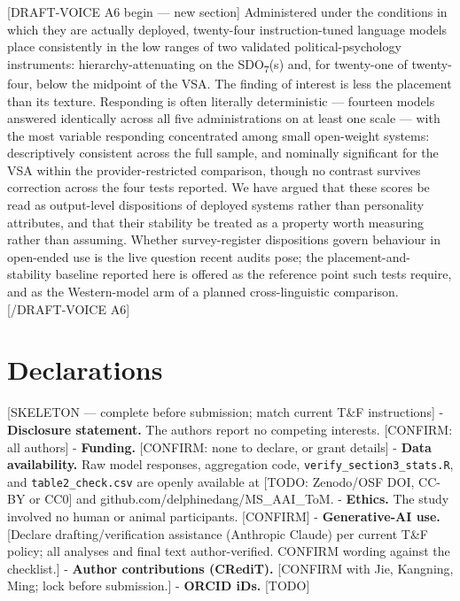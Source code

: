 \documentclass[
]{article}
\newcounter{none} %
\begin{document}
{[}DRAFT-VOICE A6 begin --- new section{]} Administered under the
conditions in which they are actually deployed, twenty-four
instruction-tuned language models place consistently in the low ranges
of two validated political-psychology instruments: hierarchy-attenuating
on the SDO\textsubscript{7}(s) and, for twenty-one of twenty-four, below
the midpoint of the VSA. The finding of interest is less the placement
than its texture. Responding is often literally deterministic ---
fourteen models answered identically across all five administrations on
at least one scale --- with the most variable responding concentrated
among small open-weight systems: descriptively consistent across the
full sample, and nominally significant for the VSA within the
provider-restricted comparison, though no contrast survives correction
across the four tests reported. We have argued that these scores be read
as output-level dispositions of deployed systems rather than personality
attributes, and that their stability be treated as a property worth
measuring rather than assuming. Whether survey-register dispositions
govern behaviour in open-ended use is the live question recent audits
pose; the placement-and-stability baseline reported here is offered as
the reference point such tests require, and as the Western-model arm of
a planned cross-linguistic comparison. {[}/DRAFT-VOICE A6{]}

\section*{Declarations}\label{declarations}

{[}SKELETON --- complete before submission; match current T\&F
instructions{]} - \textbf{Disclosure statement.} The authors report no
competing interests. {[}CONFIRM: all authors{]} - \textbf{Funding.}
{[}CONFIRM: none to declare, or grant details{]} - \textbf{Data
availability.} Raw model responses, aggregation code,
\texttt{verify\_section3\_stats.R}, and \texttt{table2\_check.csv} are
openly available at {[}TODO: Zenodo/OSF DOI, CC-BY or CC0{]} and
github.com/delphinedang/MS\_AAI\_ToM. - \textbf{Ethics.} The study
involved no human or animal participants. {[}CONFIRM{]} -
\textbf{Generative-AI use.} {[}Declare drafting/verification assistance
(Anthropic Claude) per current T\&F policy; all analyses and final text
author-verified. CONFIRM wording against the checklist.{]} -
\textbf{Author contributions (CRediT).} {[}CONFIRM with Jie, Kangning,
Ming; lock before submission.{]} - \textbf{ORCID iDs.} {[}TODO{]}
\end{document}
